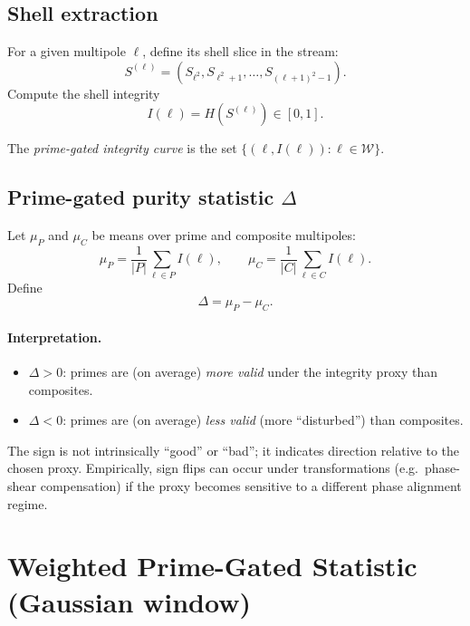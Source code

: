 \documentclass[11pt,a4paper]{article}
\begin{document}
\subsection{Shell extraction}
For a given multipole $\ell$, define its shell slice in the stream:
\begin{equation}
S^{(\ell)} = (S_{\ell^2}, S_{\ell^2+1}, \dots, S_{(\ell+1)^2-1}).
\end{equation}
Compute the shell integrity
\begin{equation}
I(\ell)=H\!\left(S^{(\ell)}\right)\in[0,1].
\end{equation}

The \emph{prime-gated integrity curve} is the set $\{(\ell, I(\ell)):\ell\in\mathcal{W}\}$.

\subsection{Prime-gated purity statistic $\Delta$}
Let $\mu_P$ and $\mu_C$ be means over prime and composite multipoles:
\begin{equation}
\mu_P=\frac{1}{|P|}\sum_{\ell\in P} I(\ell),\qquad
\mu_C=\frac{1}{|C|}\sum_{\ell\in C} I(\ell).
\end{equation}
Define
\begin{equation}
\Delta = \mu_P - \mu_C.
\end{equation}

\paragraph{Interpretation.}
\begin{itemize}
\item $\Delta>0$: primes are (on average) \emph{more valid} under the integrity proxy than composites.
\item $\Delta<0$: primes are (on average) \emph{less valid} (more ``disturbed'') than composites.
\end{itemize}
The sign is not intrinsically ``good'' or ``bad''; it indicates direction relative to
the chosen proxy. Empirically, sign flips can occur under transformations
(e.g.\ phase-shear compensation) if the proxy becomes sensitive to a different
phase alignment regime.

\section{Weighted Prime-Gated Statistic (Gaussian window)}
\end{document}
